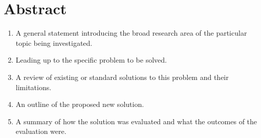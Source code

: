 \chapter{Abstract}

\begin{enumerate}
    \item A general statement introducing the broad research area of
          the particular topic being investigated.
    \item Leading up to the specific problem to be solved.
    \item A review of existing or standard solutions to this problem and
          their limitations.
    \item An outline of the proposed new solution.
    \item A summary of how the solution was evaluated and what the
          outcomes of the evaluation were.
\end{enumerate}
